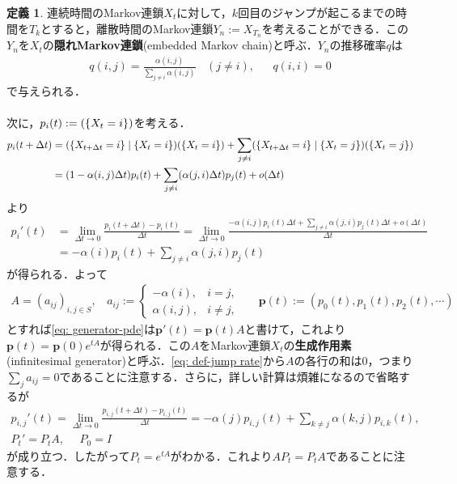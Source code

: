 \documentclass[dvipdfmx]{jsarticle}
\numberwithin{equation}{section}
\theoremstyle{definition}
\newtheorem{dfn}[thm]{定義}
\let\P\relax
\newcommand{\P}{\mathbb{P}}
\newcommand{\p}{\bm{p}}
\newcommand{\0}{\bm{0}}
\newcommand{\1}{\bm{1}}
\newcommand{\dt}{\Delta t}
\begin{document}
\begin{dfn}
  連続時間のMarkov連鎖$X_t$に対して，$k$回目のジャンプが起こるまでの時間を$T_k$とすると，離散時間のMarkov連鎖$Y_n := X_{T_n}$を考えることができる．この$Y_n$を$X_t$の{\bf 隠れMarkov連鎖}(embedded Markov chain)と呼ぶ．$Y_n$の推移確率$q$は
  \begin{align}
    q(i,j) = \frac{\alpha(i,j)}{\sum_{j \ne i} \alpha(i,j)} ~~~~ (j \ne i), && q(i,i) = 0
  \end{align}
  で与えられる．
\end{dfn}

\paragraph{} 次に，$p_i(t):=\P(\{X_t=i\})$を考える．
\begin{align}
  p_i(t + \dt) &= \P( \{X_{t + \dt} = i\} \mid \{X_t = i\} ) \P( \{X_t = i\} ) + \sum_{j \ne i} \P( \{X_{t + \dt} = i\} \mid \{X_t = j\} ) \P( \{X_t=j\} ) \\
  &= (1 - \alpha(i,j) \dt) p_i(t) + \sum_{j \ne i} (\alpha(j,i) \dt) p_j(t) + o(\dt)
\end{align}
より
\begin{align}
  p_i'(t) &= \lim_{\dt \to 0} \frac{p_i(t + \dt) - p_i(t)}{\dt} = \lim_{\dt \to 0} \frac{-\alpha(i,j) p_i(t) \dt + \sum_{j \ne i} \alpha(j,i) p_j(t) \dt + o(\dt)}{\dt} \\
  &= -\alpha(i) p_i(t) + \sum_{j \ne i} \alpha(j,i) p_j(t) \label{eq: generator-pde}
\end{align}
が得られる．よって
\begin{align}
  A = (a_{ij})_{i,j \in S}, ~~~~ a_{ij} := \begin{cases}
    -\alpha(i), & i=j, \\ 
    \alpha(i,j), & i \ne j, 
  \end{cases} && 
  \p(t) := (p_0(t), p_1(t), p_2(t), \cdots)
\end{align}
とすれば\eqref{eq: generator-pde}は$\p'(t) = \p(t)A$と書けて，これより$\p(t) = \p(0) e^{tA}$が得られる．この$A$をMarkov連鎖$X_t$の{\bf 生成作用素}(infinitesimal generator)と呼ぶ．\eqref{eq: def-jump rate}から$A$の各行の和は0，つまり$\sum_{j} a_{ij} = 0$であることに注意する．さらに，詳しい計算は煩雑になるので省略するが
\begin{gather}
  p_{i,j}'(t) = \lim_{\dt \to 0} \frac{p_{i,j}(t + \dt) - p_{i,j}(t)}{\dt} = -\alpha(j) p_{i,j}(t) + \sum_{k \ne j} \alpha(k,j) p_{i,k}(t), \\
  P_t' = P_t A, ~~~~~~ P_0=I
\end{gather}
が成り立つ．したがって$P_t = e^{tA}$がわかる．これより$AP_t=P_tA$であることに注意する．
\end{document}

